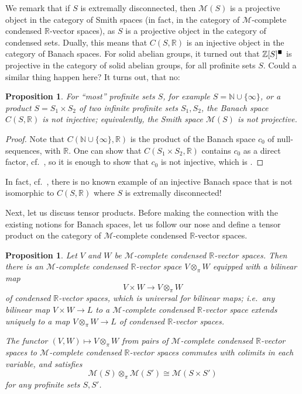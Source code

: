 \documentclass[11pt]{amsbook}
\newcommand{\solid}{{\mathsmaller{\blacksquare}}}
\numberwithin{equation}{section}
\numberwithin{theorem}{section}
\newtheorem{proposition}[theorem]{Proposition}
\theoremstyle{definition}
\begin{document}
We remark that if $S$ is extremally disconnected, then $\mathcal M(S)$ is a projective object in the category of Smith spaces (in fact, in the category of $\mathcal M$-complete condensed $\mathbb R$-vector spaces), as $S$ is a projective object in the category of condensed sets. Dually, this means that $C(S,\mathbb R)$ is an injective object in the category of Banach spaces. For solid abelian groups, it turned out that $\mathbb Z[S]^\solid$ is projective in the category of solid abelian groups, for all profinite sets $S$. Could a similar thing happen here? It turns out, that no:

\begin{proposition}\label{prop:notprojective} For ``most'' profinite sets $S$, for example $S=\mathbb N\cup \{\infty\}$, or a product $S=S_1\times S_2$ of two infinite profinite sets $S_1, S_2$, the Banach space $C(S,\mathbb R)$ is not injective; equivalently, the Smith space $\mathcal M(S)$ is not projective.
\end{proposition}

\begin{proof} Note that $C(\mathbb N\cup\{\infty\},\mathbb R)$ is the product of the Banach space $c_0$ of null-sequences, with $\mathbb R$. One can show that $C(S_1\times S_2,\mathbb R)$ contains $c_0$ as a direct factor, cf.~\cite{Cembranos}, so it is enough to show that $c_0$ is not injective, which is \cite[Theorem 1.25]{SepInjBanach}.
\end{proof}

In fact, cf.~\cite[Section 1.6.1]{SepInjBanach}, there is no known example of an injective Banach space that is not isomorphic to $C(S,\mathbb R)$ where $S$ is extremally disconnected!

Next, let us discuss tensor products. Before making the connection with the existing notions for Banach spaces, let us follow our nose and define a tensor product on the category of $\mathcal M$-complete condensed $\mathbb R$-vector spaces.

\begin{proposition} Let $V$ and $W$ be $\mathcal M$-complete condensed $\mathbb R$-vector spaces. Then there is an $\mathcal M$-complete condensed $\mathbb R$-vector space $V\otimes_\pi W$ equipped with a bilinear map
\[
V\times W\to V\otimes_\pi W
\]
of condensed $\mathbb R$-vector spaces, which is universal for bilinear maps; i.e.~any bilinear map $V\times W\to L$ to a $\mathcal M$-complete condensed $\mathbb R$-vector space extends uniquely to a map $V\otimes_\pi W\to L$ of condensed $\mathbb R$-vector spaces.

The functor $(V,W)\mapsto V\otimes_\pi W$ from pairs of $\mathcal M$-complete condensed $\mathbb R$-vector spaces to $\mathcal M$-complete condensed $\mathbb R$-vector spaces commutes with colimits in each variable, and satisfies
\[
\mathcal M(S)\otimes_\pi \mathcal M(S')\cong \mathcal M(S\times S')
\]
for any profinite sets $S,S'$.
\end{proposition}
\end{document}
